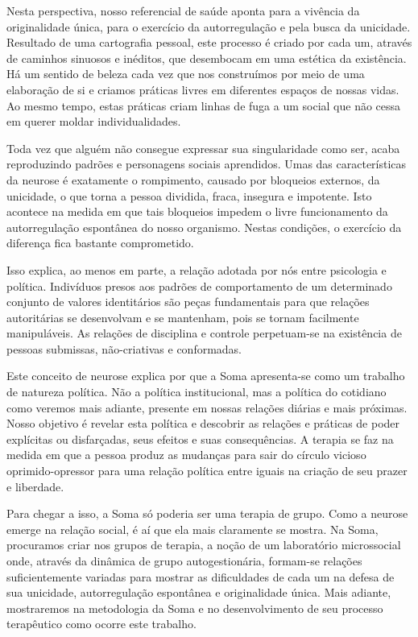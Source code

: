Nesta perspectiva, nosso referencial de saúde aponta para a vivência da
originalidade única, para o exercício da autorregulação e pela busca da
unicidade. Resultado de uma cartografia pessoal, este processo é criado
por cada um, através de caminhos sinuosos e inéditos, que desembocam em
uma estética da existência. Há um sentido de beleza cada vez que nos
construímos por meio de uma elaboração de si e criamos práticas livres
em diferentes espaços de nossas vidas. Ao mesmo tempo, estas práticas
criam linhas de fuga a um social que não cessa em querer moldar
individualidades.

Toda vez que alguém não consegue expressar sua singularidade como ser,
acaba reproduzindo padrões e personagens sociais aprendidos. Umas das
características da neurose é exatamente o rompimento, causado por
bloqueios externos, da unicidade, o que torna a pessoa dividida, fraca,
insegura e impotente. Isto acontece na medida em que tais bloqueios
impedem o livre funcionamento da autorregulação espontânea do nosso
organismo. Nestas condições, o exercício da diferença fica bastante
comprometido.

Isso explica, ao menos em parte, a relação adotada por nós entre
psicologia e política. Indivíduos presos aos padrões de comportamento de
um determinado conjunto de valores identitários são peças fundamentais
para que relações autoritárias se desenvolvam e se mantenham, pois se
tornam facilmente manipuláveis. As relações de disciplina e controle
perpetuam-se na existência de pessoas submissas, não-criativas e
conformadas.

Este conceito de neurose explica por que a Soma apresenta-se como um
trabalho de natureza política. Não a política institucional, mas a
política do cotidiano como veremos mais adiante, presente em nossas
relações diárias e mais próximas. Nosso objetivo é revelar esta política
e descobrir as relações e práticas de poder explícitas ou disfarçadas,
seus efeitos e suas consequências. A terapia se faz na medida em que a
pessoa produz as mudanças para sair do círculo vicioso oprimido-opressor
para uma relação política entre iguais na criação de seu prazer e
liberdade.

Para chegar a isso, a Soma só poderia ser uma terapia de grupo. Como a
neurose emerge na relação social, é aí que ela mais claramente se
mostra. Na Soma, procuramos criar nos grupos de terapia, a noção de um
laboratório microssocial onde, através da dinâmica de grupo
autogestionária, formam-se relações suficientemente variadas para
mostrar as dificuldades de cada um na defesa de sua unicidade,
autorregulação espontânea e originalidade única. Mais adiante,
mostraremos na metodologia da Soma e no desenvolvimento de seu processo
terapêutico como ocorre este trabalho.

